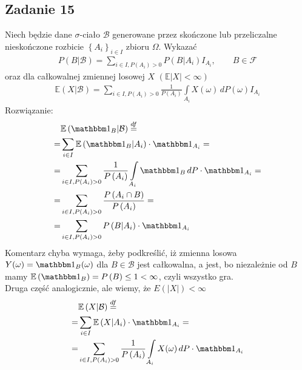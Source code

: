 \subsection*{Zadanie 15}
Niech będzie dane $ \sigma $-ciało $ \mathcal B $ generowane przez skończone lub przeliczalne nieskończone rozbicie $ \left\{A_i\right\}_{i\in I} $ zbioru $ \Omega $. Wykazać
\begin{gather*}
P\left(B|\mathcal B\right)=\sum_{i\in I,P\left(A_i\right)>0}P\left(B|A_i\right)I_{A_i},\qquad B\in \mathcal F 
\end{gather*}
oraz dla całkowalnej zmiennej losowej $ X $ $ \left(\mathbb E \left|X\right|<\infty \right) $
\begin{gather*}
\mathbb E \left(X|\mathcal B\right)=\sum_{i\in I,P\left(A_i\right)>0}\frac{1}{P\left(A_i\right)}\int\limits_{A_i}X(\omega)\,dP(\omega)I_{A_i}
\end{gather*}
Rozwiązanie:
\begin{align*}
&\mathbb E \left(\mathbbm1_{B}|\mathcal B\right)
\stackrel{df}{=}\\=&
\sum_{i\in I}\mathbb E \left(\mathbbm1_{B}|A_i\right)\cdot\mathbbm1_{A_i}
=\\=&
\sum_{i\in I,P\left(A_i\right)>0}
\frac{1}{P\left(A_i\right)}\int\limits_{A_i}\mathbbm1_{B}\,dP\cdot\mathbbm1_{A_i}
=\\=&
\sum_{i\in I,P\left(A_i\right)>0}
\frac{P\left(A_i\cap B\right)}{P\left(A_i\right)}
=\\=&
\sum_{i\in I,P\left(A_i\right)>0}
P\left(B|A_i\right)\cdot\mathbbm1_{A_i}
\end{align*}
Komentarz chyba wymaga, żeby podkreślić, iż zmienna losowa $ Y(\omega)=\mathbbm1_{B}(\omega) $ dla $ B\in\mathcal B $ jest całkowalna, a jest, bo niezależnie od $ B $ mamy $ \mathbb E \left(\mathbbm1_{B}\right)=P\left(B\right)\le1<\infty  $, czyli wszystko gra.\\
Druga część analogicznie, ale wiemy, że $ E\left(|X|\right)<\infty  $
\begin{align*}
&\mathbb E \left(X|\mathcal B\right)
\stackrel{df}{=}\\=&
\sum_{i\in I}\mathbb E \left(X|A_i\right)\cdot\mathbbm1_{A_i}
=\\=&
\sum_{i\in I,P\left(A_i\right)>0}
\frac{1}{P\left(A_i\right)}\int\limits_{A_i}X(\omega)\,dP\cdot\mathbbm1_{A_i}
\end{align*}

